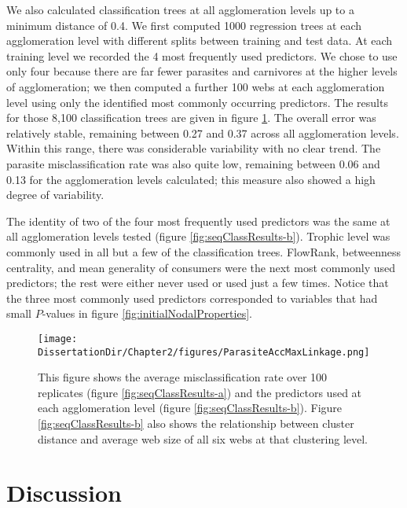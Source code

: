 \documentclass[../dissertation.tex]{subfiles}
\begin{document}
We also calculated classification trees at all agglomeration levels up to a
minimum distance of 0.4. We first computed 1000 regression trees at each
agglomeration level with different splits between training and test data. At
each training level we recorded the 4 most frequently used predictors. We chose
to use only four because there are far fewer parasites and carnivores at the
higher levels of agglomeration; we then computed a further 100 webs at each
agglomeration level using only the identified most commonly occurring
predictors.  The results for those 8,100 classification trees are given in
figure \ref{fig:seqClassResults}. The overall error was relatively stable,
remaining between 0.27 and 0.37 across all agglomeration levels. Within this
range, there was considerable variability with no clear trend. The parasite
misclassification rate was also quite low, remaining between 0.06 and 0.13 for
the agglomeration levels calculated; this measure also showed a high degree of
variability.

The identity of two of the four most frequently used predictors was the same at
all agglomeration levels tested (figure \ref{fig:seqClassResults-b}). Trophic
level was commonly used in all but a few of the classification trees. FlowRank,
betweenness centrality, and mean generality of consumers were the next most
commonly used predictors; the rest were either never used or used just a few
times. Notice that the three most commonly used predictors corresponded to
variables that had small $P$-values in figure \ref{fig:initialNodalProperties}.

\begin{figure}
    \centering
    {%
    }%

        \texttt{[image: \\DissertationDir/Chapter2/figures/ParasiteAccMaxLinkage.png]}
        \caption{This figure shows the average misclassification rate over 100
            replicates (figure \ref{fig:seqClassResults-a}) and the predictors
            used at each agglomeration level (figure
            \ref{fig:seqClassResults-b}). Figure \ref{fig:seqClassResults-b}
            also shows the relationship between cluster distance and average
            web size of all six webs at that clustering level.  
        \label{fig:seqClassResults}} 
\end{figure}

\section{Discussion} 
\end{document}
